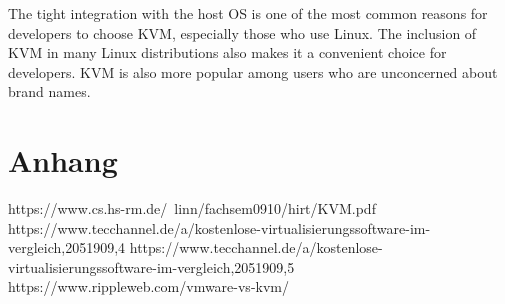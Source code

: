 \documentclass[14pt]{extreport}
\begin{document}
The tight integration with the host OS is one of the most common reasons for developers to choose KVM, especially those who use Linux. The inclusion of KVM in many Linux distributions also makes it a convenient choice for developers. KVM is also more popular among users who are unconcerned about brand names.
\chapter{Anhang}
\printbibliography


https://www.cs.hs-rm.de/~linn/fachsem0910/hirt/KVM.pdf
https://www.tecchannel.de/a/kostenlose-virtualisierungssoftware-im-vergleich,2051909,4
https://www.tecchannel.de/a/kostenlose-virtualisierungssoftware-im-vergleich,2051909,5
https://www.rippleweb.com/vmware-vs-kvm/
\end{document}
